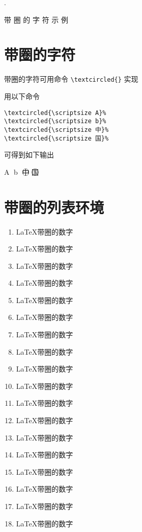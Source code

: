 \documentclass[11pt,a4paper,openany]{article}
\begin{document}
\begin{CJK*}{UTF8}{song}
\renewcommand\labelenumi{\textcircled{\scriptsize \theenumi}}  %

\textcolor[rgb]{0.98,0.00,0.00}{      .}

\textcolor[rgb]{0.00,0.00,1.00}{带 圈 的 字 符 示 例}


\section{带圈的字符}
带圈的字符可用命令 \verb"\textcircled{}" 实现

用以下命令
\begin{verbatim}
\textcircled{\scriptsize A}%
\textcircled{\scriptsize b}%
\textcircled{\scriptsize 中}%
\textcircled{\scriptsize 国}%
\end{verbatim}

可得到如下输出

\textcircled{\scriptsize A}
\textcircled{\scriptsize b}
\textcircled{\scriptsize 中}
\textcircled{\scriptsize 国}

\section{带圈的列表环境}
\begin{enumerate}
    \item \LaTeX 带圈的数字
    \item \LaTeX 带圈的数字
    \item \LaTeX 带圈的数字
    \item \LaTeX 带圈的数字
    \item \LaTeX 带圈的数字
    \item \LaTeX 带圈的数字
    \item \LaTeX 带圈的数字
    \item \LaTeX 带圈的数字
    \item \LaTeX 带圈的数字
    \item \LaTeX 带圈的数字
    \item \LaTeX 带圈的数字
    \item \LaTeX 带圈的数字
    \item \LaTeX 带圈的数字
    \item \LaTeX 带圈的数字
    \item \LaTeX 带圈的数字
    \item \LaTeX 带圈的数字
    \item \LaTeX 带圈的数字
    \item \LaTeX 带圈的数字
\end{enumerate}



\end{CJK*}
\end{document}

